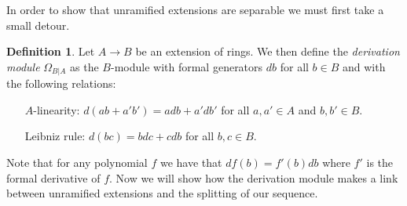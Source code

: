 \documentclass[11pt, a4paper, english]{article}
\theoremstyle{definition}
\newtheorem{defin}[theorem]{Definition}
\begin{document}
In order to show that unramified extensions are separable we must first take a small detour.

\begin{defin}
Let $A \to B$ be an extension of rings. We then define the \textit{derivation module} $\Omega_{B | A}$ as the $B$-module with formal generators $db$ for all $b \in B$ and with the following relations:
\begin{enumerate}[leftmargin=3cm]
\item[$A$-linearity:] $d(ab + a'b') = adb + a'db'$ for all $a, a' \in A$ and $b, b' \in B$.
\item[Leibniz rule:] $d(bc) = bdc + cdb$ for all $b,c \in B$.
\end{enumerate}
\end{defin}
Note that for any polynomial $f$ we have that $df(b) = f'(b)db$ where $f'$ is the formal derivative of $f$. Now we will show how the derivation module makes a link between unramified extensions and the splitting of our sequence.
\end{document}
